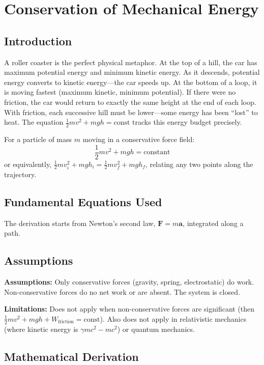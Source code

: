 \chapter{Conservation of Mechanical Energy}

\section*{Introduction}

A roller coaster is the perfect physical metaphor. At the top of a hill, the car has maximum potential energy and minimum kinetic energy. As it descends, potential energy converts to kinetic energy---the car speeds up. At the bottom of a loop, it is moving fastest (maximum kinetic, minimum potential). If there were no friction, the car would return to exactly the same height at the end of each loop. With friction, each successive hill must be lower---some energy has been ``lost'' to heat. The equation $\frac{1}{2}mv^2 + mgh = \text{const}$ tracks this energy budget precisely.


For a particle of mass $m$ moving in a conservative force field:
\[
\frac{1}{2}mv^2 + mgh = \text{constant}
\]
or equivalently, $\frac{1}{2}mv_i^2 + mgh_i = \frac{1}{2}mv_f^2 + mgh_f$, relating any two points along the trajectory.

\section*{Fundamental Equations Used}

The derivation starts from Newton's second law, $\mathbf{F} = m\mathbf{a}$, integrated along a path.

\section*{Assumptions}

\textbf{Assumptions:} Only conservative forces (gravity, spring, electrostatic) do work. Non-conservative forces do no net work or are absent. The system is closed.


\textbf{Limitations:} Does not apply when non-conservative forces are significant (then $\frac{1}{2}mv^2 + mgh + W_{\text{friction}} = \text{const}$). Also does not apply in relativistic mechanics (where kinetic energy is $\gamma mc^2 - mc^2$) or quantum mechanics.


\section*{Mathematical Derivation}

